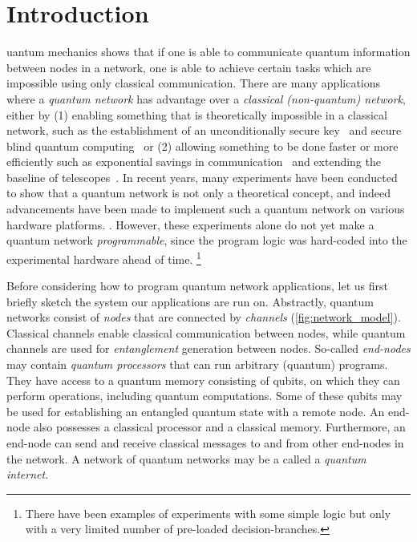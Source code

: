 \section{Introduction}
\label{sec:introduction}
uantum mechanics shows that if one is able to communicate quantum information between nodes in a network, one is able to achieve certain tasks which are impossible using only classical communication.
There are many applications~\cite{Wehner2018stages} where a \emph{quantum network} has advantage over a \emph{classical (non-quantum) network}, either by
    (1) enabling something that is theoretically impossible in a classical network, such as the establishment of an unconditionally secure key~\cite{bb84} and secure blind quantum computing~\cite{childs2005assisted} or
    (2) allowing something to be done faster or more efficiently such as exponential savings in communication~\cite{Buhrman2010} and extending the baseline of telescopes~\cite{gottesman2012longer}.
In recent years, many experiments have been conducted to show that a quantum network is not only a theoretical concept, and indeed advancements have been made to implement such a quantum network on various hardware platforms.
\cite{Hensen2015, Humphreys2018, moehring2007entanglement, hofmann2012heralded, Kalb2017, Inlek2017, sangouard2011quantum}.
However, these experiments alone do not yet make a quantum network \textit{programmable}, since the program logic was hard-coded into the experimental hardware ahead of time.
\footnote{There have been examples of experiments with some simple logic but only with a very limited number of pre-loaded decision-branches.}

Before considering how to program quantum network applications, let us first briefly sketch the system our applications are run on.
Abstractly, quantum networks consist of \textit{nodes} that are connected by \textit{channels} (\cref{fig:network_model}).
Classical channels enable classical communication between nodes, while quantum channels are used for \textit{entanglement} generation between nodes.
So-called \textit{end-nodes} may contain \textit{quantum processors} that can run arbitrary (quantum) programs.
They have access to a quantum memory consisting of qubits, on which they can perform operations, including quantum computations.
Some of these qubits may be used for establishing an entangled quantum state with a remote node.
An end-node also possesses a classical processor and a classical memory.
Furthermore, an end-node can send and receive classical messages to and from other end-nodes in the network.
A network of quantum networks may be a called a \textit{quantum internet}.

